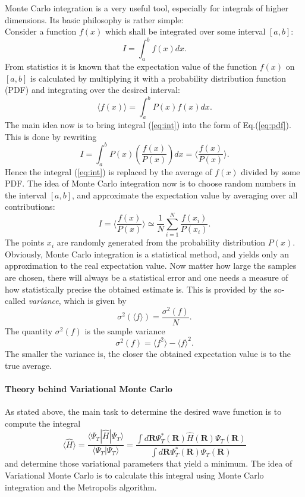 Monte Carlo integration is a very useful tool, especially for integrals of higher dimensions. Its basic philosophy is rather simple:\\
Consider a function $f(x)$ which shall be integrated over some interval $[a,b]$:
\begin{equation}
\label{eq:int}
I = \int_a^b f(x)dx.
\end{equation}
From statistics it is known that the expectation value of the function $f(x)$ on $[a,b]$ is calculated by multiplying it with a probability distribution function (PDF) and integrating over the desired interval:
\begin{equation}
\label{eq:pdf}
\langle f(x) \rangle = \int_a^ b P(x)f(x) dx.
\end{equation}
The main idea now is to bring integral (\ref{eq:int}) into the form of Eq.(\ref{eq:pdf}). This is done by rewriting
\[
I = \int_a^b P(x) \left(\frac{f(x)}{P(x)}\right) dx = \langle\frac{f(x)}{P(x)}\rangle.
\]
Hence the integral  (\ref{eq:int}) is replaced by the average of  $f(x)$ divided by some PDF. The idea of Monte Carlo integration now is to choose random numbers in the interval $[a,b]$, and approximate the expectation value by averaging over all contributions:
\begin{equation}
\label{eq:importance}
I = \langle \frac{f(x)}{P(x)}\rangle \simeq \frac{1}{N}\sum\limits_{i=1}^N \frac{f(x_i)}{P(x_i)}.
\end{equation}
The points $x_i$ are randomly generated from the probability distribution $P(x)$.\\
Obviously, Monte Carlo integration is a statistical method, and yields only an approximation to the real expectation value. Now matter how large the samples are chosen, there will always be a statistical error and one needs a measure of how statistically precise the obtained estimate is. This is provided by the so-called \textit{variance}, which is given by
\[
\sigma^2\left(\langle f \rangle\right) = \frac{\sigma^2(f)}{N}.
\]
The  quantity $\sigma^2(f)$ is the sample variance
\[
\sigma^2(f) = \langle f^2 \rangle - \langle f \rangle^2.
\]
The smaller the variance is, the closer the obtained expectation value is to the true average.


\paragraph{Theory behind Variational Monte Carlo}
As stated above, the main task  to determine the desired wave function is to compute the integral
\begin{equation*}
   \langle \hat H \rangle = 
    \frac{\langle\Psi_T|\hat{H}|\Psi_T\rangle}{\langle\Psi_T|\Psi_T\rangle} = 
   \frac{\int d\mathbf{R}\Psi^{\ast}_T(\mathbf{R})\hat H(\mathbf{R})\Psi_T(\mathbf{R})}
        {\int d\mathbf{R}\Psi^{\ast}_T(\mathbf{R})\Psi_T(\mathbf{R})}
\end{equation*}
and determine those variational parameters that yield a minimum.  
The idea of Variational Monte Carlo is to calculate this integral using Monte Carlo integration and the Metropolis algorithm.

